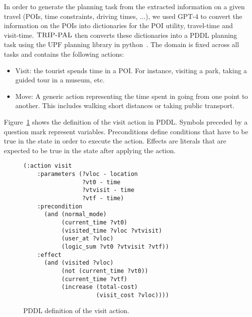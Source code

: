 \documentclass[letterpaper]{article}
\newcommand{\gpt}{{\sc GPT-4}\xspace}
\newcommand{\approach}{\ensuremath{\textsc{TRIP-PAL}}\xspace}
\begin{document}
In order to generate the planning task from the extracted information on a given travel (POIs, time constraints, driving times, ...), we used \gpt to convert the information on the POIs into dictionaries for the POI utility, travel-time and visit-time. \approach then converts these dictionaries into a PDDL planning task using the UPF planning library in python~\cite{upf}. The domain is fixed across all tasks and contains the following actions:

    \begin{itemize}
        \item Visit: the tourist spends time in a POI. For instance, visiting a park, taking a guided tour in a museum, etc.
        \item Move: A generic action representing the time spent in going from one point to another. This includes walking short distances or taking public transport.
    \end{itemize}

 Figure~\ref{fig:pddl-visit} shows the definition of the visit action in PDDL. Symbols preceded by a question mark represent variables. Preconditions define conditions that have to be true in the state in order to execute the action. Effects are literals that are expected to be true in the state after applying the action. 

\begin{figure}
\centering
\footnotesize{
\begin{verbatim}
(:action visit
    :parameters (?vloc - location 
                 ?vt0 - time 
                 ?vtvisit - time 
                 ?vtf - time)
    :precondition
      (and (normal_mode) 
           (current_time ?vt0) 
           (visited_time ?vloc ?vtvisit) 
           (user_at ?vloc) 
           (logic_sum ?vt0 ?vtvisit ?vtf))
    :effect 
      (and (visited ?vloc) 
           (not (current_time ?vt0)) 
           (current_time ?vtf) 
           (increase (total-cost) 
                     (visit_cost ?vloc))))    
\end{verbatim}
}
\caption{PDDL definition of the visit action.}
\label{fig:pddl-visit}
\end{figure}
\end{document}
